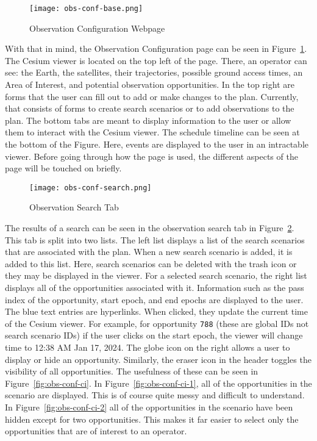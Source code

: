 \begin{figure}
    \centering
    \texttt{[image: obs-conf-base.png]} 
    \caption{Observation Configuration Webpage}
    \label{fig:obs-conf-base} 
\end{figure}


With that in mind, the Observation Configuration page can be seen in
Figure~\ref{fig:obs-conf-base}. The Cesium viewer is located on the top left of
the page.  There, an operator can see: the Earth, the satellites, their
trajectories, possible ground access times, an Area of Interest, and potential
observation opportunities. In the top right are forms that the user can fill
out to add or make changes to the plan. Currently, that consists of forms to
create search scenarios or to add observations to the plan. The bottom tabs are
meant to display information to the user or allow them to interact with the
Cesium viewer. The schedule timeline can be seen at the bottom of the Figure.
Here, events are displayed to the user in an intractable viewer. Before going
through how the page is used, the different aspects of the page will be touched
on briefly. 

\begin{figure}
    \centering
    \texttt{[image: obs-conf-search.png]} 
    \caption{Observation Search Tab}
    \label{fig:obs-conf-search} 
\end{figure}

The results of a search can be seen in the observation search tab in
Figure~\ref{fig:obs-conf-search}. This tab is split into two lists. The left
list displays a list of the search scenarios that are associated with the plan.
When a new search scenario is added, it is added to this list. Here, search
scenarios can be deleted with the trash icon or they may be displayed in the
viewer. For a selected search scenario, the right list displays all of the
opportunities associated with it. Information such as the pass index of the
opportunity, start epoch, and end epochs are displayed to the user. The blue
text entries are hyperlinks. When clicked, they update the current time of the
Cesium viewer. For example, for opportunity \texttt{788} (these are global IDs
not search scenario IDs) if the user clicks on the start epoch, the viewer will
change time to 12:38 AM Jan 17, 2024. The globe icon on the right allows a user
to display or hide an opportunity. Similarly, the eraser icon in the header
toggles the visibility of all opportunities.  The usefulness of these can be
seen in Figure~\ref{fig:obs-conf-ci}.  In Figure~\ref{fig:obs-conf-ci-1},
all of the opportunities in the scenario are displayed. This is of course quite
messy and difficult to understand. In Figure~\ref{fig:obs-conf-ci-2} all of
the opportunities in the scenario have been hidden except for two
opportunities. This makes it far easier to select only the opportunities that
are of interest to an operator.


